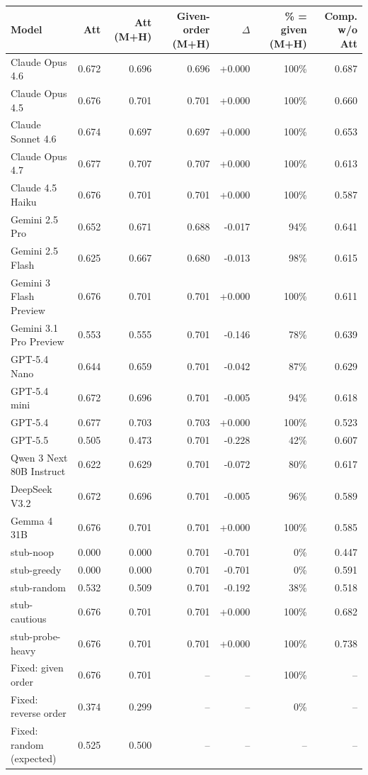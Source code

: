\begin{tabular}{lrrrrrr}
\toprule
Model & Att & Att (M+H) & Given-order (M+H) & $\Delta$ & \% = given (M+H) & Comp. w/o Att \\
\midrule
Claude Opus 4.6 & 0.672 & 0.696 & 0.696 & +0.000 & 100\% & 0.687 \\
Claude Opus 4.5 & 0.676 & 0.701 & 0.701 & +0.000 & 100\% & 0.660 \\
Claude Sonnet 4.6 & 0.674 & 0.697 & 0.697 & +0.000 & 100\% & 0.653 \\
Claude Opus 4.7 & 0.677 & 0.707 & 0.707 & +0.000 & 100\% & 0.613 \\
Claude 4.5 Haiku & 0.676 & 0.701 & 0.701 & +0.000 & 100\% & 0.587 \\
Gemini 2.5 Pro & 0.652 & 0.671 & 0.688 & -0.017 & 94\% & 0.641 \\
Gemini 2.5 Flash & 0.625 & 0.667 & 0.680 & -0.013 & 98\% & 0.615 \\
Gemini 3 Flash Preview & 0.676 & 0.701 & 0.701 & +0.000 & 100\% & 0.611 \\
Gemini 3.1 Pro Preview & 0.553 & 0.555 & 0.701 & -0.146 & 78\% & 0.639 \\
GPT-5.4 Nano & 0.644 & 0.659 & 0.701 & -0.042 & 87\% & 0.629 \\
GPT-5.4 mini & 0.672 & 0.696 & 0.701 & -0.005 & 94\% & 0.618 \\
GPT-5.4 & 0.677 & 0.703 & 0.703 & +0.000 & 100\% & 0.523 \\
GPT-5.5 & 0.505 & 0.473 & 0.701 & -0.228 & 42\% & 0.607 \\
Qwen 3 Next 80B Instruct & 0.622 & 0.629 & 0.701 & -0.072 & 80\% & 0.617 \\
DeepSeek V3.2 & 0.672 & 0.696 & 0.701 & -0.005 & 96\% & 0.589 \\
Gemma 4 31B & 0.676 & 0.701 & 0.701 & +0.000 & 100\% & 0.585 \\
stub-noop & 0.000 & 0.000 & 0.701 & -0.701 & 0\% & 0.447 \\
stub-greedy & 0.000 & 0.000 & 0.701 & -0.701 & 0\% & 0.591 \\
stub-random & 0.532 & 0.509 & 0.701 & -0.192 & 38\% & 0.518 \\
stub-cautious & 0.676 & 0.701 & 0.701 & +0.000 & 100\% & 0.682 \\
stub-probe-heavy & 0.676 & 0.701 & 0.701 & +0.000 & 100\% & 0.738 \\
\midrule
Fixed: given order & 0.676 & 0.701 & -- & -- & 100\% & -- \\
Fixed: reverse order & 0.374 & 0.299 & -- & -- & 0\% & -- \\
Fixed: random (expected) & 0.525 & 0.500 & -- & -- & -- & -- \\
\bottomrule
\end{tabular}
